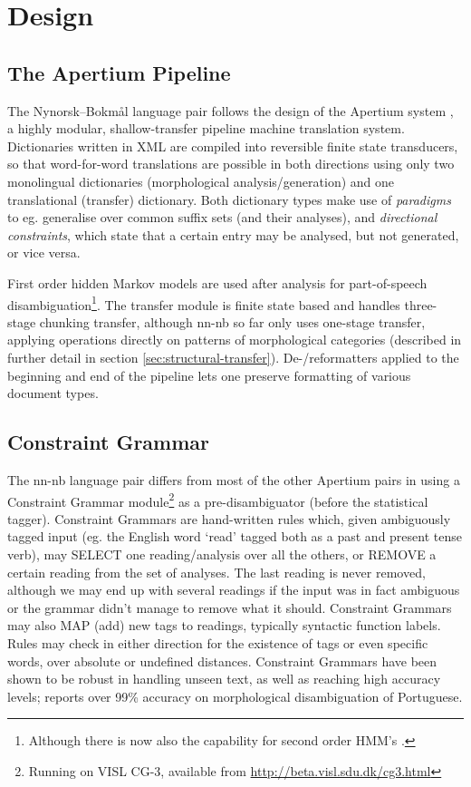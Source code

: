 \documentclass[11pt]{article}
\begin{document}
\section{Design}
 \label{sec:design}
\subsection{The Apertium Pipeline}
 The Nynorsk–Bokmål language pair follows the design of the Apertium
 system
 \citep{corbi05oss}, a highly modular, shallow-transfer pipeline
 machine translation system. Dictionaries written in XML are compiled
 into reversible finite state transducers, so that word-for-word
 translations are possible in both directions using only two
 monolingual dictionaries (morphological analysis/generation) and one
 translational (transfer) dictionary. Both dictionary types make use of
 \emph{paradigms} to eg. generalise over common suffix sets (and
 their analyses), and \emph{directional constraints}, which state that
 a certain entry may be analysed, but not generated, or vice versa.

 First order hidden Markov models are used after analysis for
 part-of-speech disambiguation\footnote{Although there is now also the
   capability for second order HMM's \citep{sheikh2009trigram}. }.
 The transfer module is finite state based and handles
 three-stage chunking transfer, although nn-nb so far only uses
 one-stage
 transfer, applying operations directly on patterns of morphological
 categories (described in further detail in section
 \ref{sec:structural-transfer}).
 De-/reformatters
 applied to the beginning and end of the pipeline lets one preserve
 formatting of various document types.

\subsection{Constraint Grammar}
The nn-nb language pair differs from most of the other Apertium pairs
in using a Constraint Grammar module\footnote{Running on VISL CG-3,
  available from
  \href{http://beta.visl.sdu.dk/cg3.html}{http://beta.visl.sdu.dk/cg3.html}
} as a pre-disambiguator (before the statistical tagger). Constraint
Grammars \citep{karlsson1990cgf} are hand-written rules which, given
ambiguously tagged input (eg. the English word `read' tagged both as a
past and present tense verb), may SELECT one reading/analysis over all
the others, or REMOVE a certain reading from the set of analyses. The
last reading is never removed, although we may end up with several
readings if the input was in fact ambiguous or the grammar didn't
manage to remove what it should. Constraint Grammars may also MAP
(add) new tags to readings, typically syntactic function labels. Rules
may check in either direction for the existence of tags or even
specific words, over absolute or undefined distances. Constraint
Grammars have been shown to be robust in handling unseen text, as well
as reaching high accuracy levels; \citet[p.~8]{bick1996app} reports
over 99\% accuracy on morphological disambiguation of Portuguese.
\end{document}
